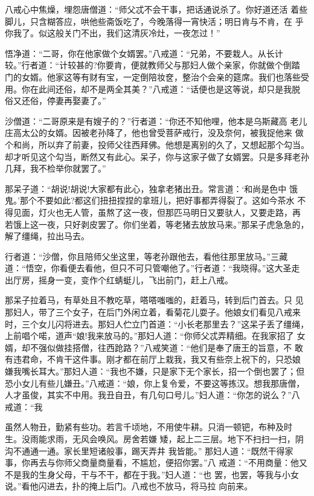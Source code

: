 八戒心中焦燥，埋怨唐僧道：“师父忒不会干事，把话通说杀了。你好道还活
着些脚儿，只含糊答应，哄他些斋饭吃了，今晚落得一宵快活；明日肯与不肯，在
乎你我了。似这般关门不出，我们这清灰冷灶，一夜怎过！”

悟净道：“二哥，你在他家做个女婿罢。”八戒道：“兄弟，不要栽人。从长计
较。”行者道：“计较甚的?你要肯，便就教师父与那妇人做个亲家，你就做个倒踏
门的女婿。他家这等有财有宝，一定倒陪妆奁，整治个会亲的筵席。我们也落些受
用。你在此间还俗，却不是两全其美？”八戒道：“话便也是这等说，却只是我脱
俗又还俗，停妻再娶妻了。”

沙僧道：“二哥原来是有嫂子的？”行者道：“你还不知他哩，他本是乌斯藏高
老儿庄高太公的女婿。因被老孙降了，他也曾受菩萨戒行，没及奈何，被我捉他来
做个和尚，所以弃了前妻，投师父往西拜佛。他想是离别的久了，又想起那个勾当。
却才听见这个勾当，断然又有此心。呆子，你与这家子做了女婿罢。只是多拜老孙
几拜，我不检举你就罢了。”

那呆子道：“胡说!胡说!大家都有此心，独拿老猪出丑。常言道：‘和尚是色中
饿鬼。’那个不要如此?都这们扭扭捏捏的拿班儿，把好事都弄得裂了。这如今茶水
不得见面，灯火也无人管，虽熬了这一夜，但那匹马明日又要驮人，又要走路，再
若饿上这一夜，只好剥皮罢了。你们坐着，等老猪去放放马来。”那呆子虎急急的，
解了缰绳，拉出马去。

行者道：“沙僧，你且陪师父坐这里，等老孙跟他去，看他往那里放马。”三藏
道：“悟空，你看便去看他，但只不可只管嘲他了。”行者道：“我晓得。”这大圣走
出厅房，摇身一变，变作个红蜻蜓儿，飞出前门，赶上八戒。

那呆子拉着马，有草处且不教吃草，嗒嗒嗤嗤的，赶着马，转到后门首去。只
见那妇人，带了三个女子，在后门外闲立着，看菊花儿耍子。他娘女们看见八戒来
时，三个女儿闪将进去。那妇人伫立门首道：“小长老那里去？”这呆子丢了缰绳，
上前唱个喏，道声“娘!我来放马的。”那妇人道：“你师父忒弄精细。在我家招了
女婿，却不强似做挂搭僧，往西跄路？”八戒笑道：“他们是奉了唐王的旨意，不
敢有违君命，不肯干这件事。刚才都在前厅上栽我，我又有些奈上祝下的，只恐娘
嫌我嘴长耳大。”那妇人道：“我也不嫌，只是家下无个家长，招一个倒也罢了；但
恐小女儿有些儿嫌丑。”八戒道：“娘，你上复令爱，不要这等拣汉。想我那唐僧，
人才虽俊，其实不中用。我丑自丑，有几句口号儿。”妇人道：“你怎的说么？”八
戒道：“我

虽然人物丑，勤紧有些功。若言千顷地，不用使牛耕。只消一顿钯，布种及时
生。没雨能求雨，无风会唤风。房舍若嫌
矮，起上二三层。地下不扫扫一扫，阴沟不通通一通。家长里短诸般事，踢天弄井
我皆能。”
那妇人道：“既然干得家事，你再去与你师父商量商量看，不尴尬，便招你罢。”八
戒道：“不用商量：他又不是我的生身父母，干与不干，都在于我。”妇人道：“也
罢，也罢，等我与小女说。”看他闪进去，扑的掩上后门。八戒也不放马，将马拉
向前来。

